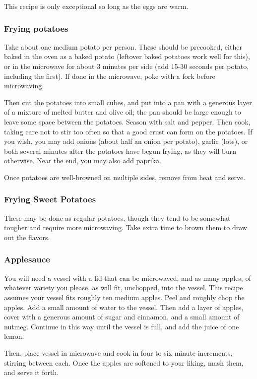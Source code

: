 \documentclass[10pt]{article}
\begin{document}
This recipe is only exceptional so long as the eggs are warm.

\subsubsection*{Frying potatoes}

Take about one medium potato per person.
These should be precooked, either baked in the oven as a baked potato (leftover baked potatoes work well for this), or in the microwave for about 3 minutes per side (add 15-30 seconds per potato, including the first).
If done in the microwave, poke with a fork before microwaving.

Then cut the potatoes into small cubes, and put into a pan with a generous layer of a mixture of melted butter and olive oil; the pan should be large enough to leave some space between the potatoes.
Season with salt and pepper.
Then cook, taking care not to stir too often so that a good crust can form on the potatoes.
If you wish, you may add onions (about half an onion per potato), garlic (lots), or both several minutes after the potatoes have begun frying, as they will burn otherwise.
Near the end, you may also add paprika.

Once potatoes are well-browned on multiple sides, remove from heat and serve.

\subsubsection*{Frying Sweet Potatoes}

These may be done as regular potatoes, though they tend to be somewhat tougher and require more microwaving.
Take extra time to brown them to draw out the flavors.

\subsubsection*{Applesauce}

You will need a vessel with a lid that can be microwaved, and as many apples, of whatever variety you please, as will fit, unchopped, into the vessel.
This recipe assumes your vessel fits roughly ten medium apples.
Peel and roughly chop the apples.
Add a small amount of water to the vessel.
Then add a layer of apples, cover with a generous amount of sugar and cinnamon, and a small amount of nutmeg.
Continue in this way until the vessel is full, and add the juice of one lemon.

Then, place vessel in microwave and cook in four to six minute increments, stirring between each.
Once the apples are softened to your liking, mash them, and serve it forth.
\end{document}

